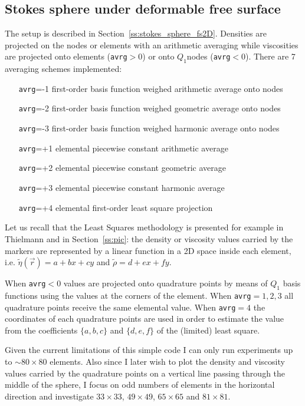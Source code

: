 \newpage
\subsection*{Stokes sphere under deformable free surface}

The setup is described in Section~\ref{ss:stokes_sphere_fs2D}. 
Densities are projected on the nodes or elements with an arithmetic averaging while
viscosities are projected onto elements ({\tt avrg}$>0$) or onto $Q_1$nodes ({\tt avrg}$<0$).
There are 7 averaging schemes implemented:
\begin{itemize}
\item[{\tt avrg}=-1] first-order basis function weighed arithmetic average onto nodes
\item[{\tt avrg}=-2] first-order basis function weighed geometric average onto nodes
\item[{\tt avrg}=-3] first-order basis function weighed harmonic average onto nodes
\item[{\tt avrg}=+1]  elemental piecewise constant arithmetic average 
\item[{\tt avrg}=+2]  elemental piecewise constant geometric average 
\item[{\tt avrg}=+3]  elemental piecewise constant harmonic average 
\item[{\tt avrg}=+4]  elemental first-order least square projection 
\end{itemize}

Let us recall that the Least Squares methodology is presented for example in 
Thielmann \etal \cite{thmk14} and in Section~\ref{ss:pic}:
the density or viscosity values carried by the markers are represented by a linear 
function in a 2D space inside each 
element, i.e. $\tilde{\eta}({\vec r}) = a + b x+c y$ and $\tilde{\rho}=d+ex+fy$.

When {\tt avrg}$<0$ values are projected onto quadrature points by means 
of $Q_1$ basis functions using the values at the corners of the element.
When {\tt avrg}$=1,2,3$ all quadrature points receive the same elemental value. 
When {\tt avrg}$=4$ the coordinates of each quadrature points are used in order to 
estimate the value from the coefficients $\{a,b,c\}$ and $\{d,e,f\}$ 
of the (limited) least square.

Given the current limitations of this simple code I can only run experiments up to $\sim 80\times80$ elements.
Also since I later wish to plot the density and viscosity values carried by the quadrature points 
on a vertical line passing through the middle of the sphere, I focus on odd numbers of elements
in the horizontal direction and investigate $33\times33$, $49\times49$, $65\times65$ and $81\times81$.

